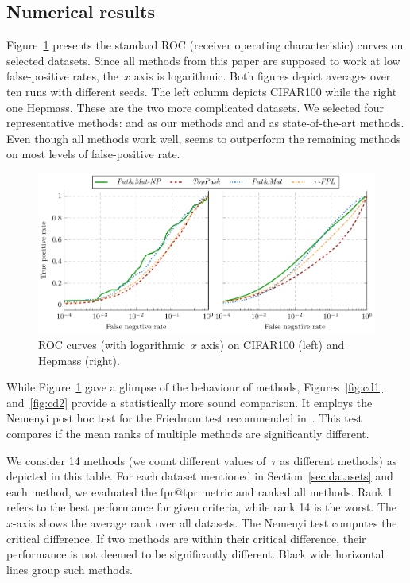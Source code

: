 \subsection{Numerical results}

Figure~\ref{fig:ptau} presents the standard ROC (receiver operating characteristic) curves on selected datasets. Since all methods from this paper are supposed to work at low false-positive rates, the~$x$ axis is logarithmic. Both figures depict averages over ten runs with different seeds. The left column depicts CIFAR100 while the right one Hepmass. These are the two more complicated datasets. We selected four representative methods: \PatMat and \PatMatNP as our methods and \TopPush and \tauFPL as state-of-the-art methods. Even though all methods work well, \PatMatNP seems to outperform the remaining methods on most levels of false-positive rate.

\begin{figure}[!ht]
  \centering
  \includegraphics[width = \linewidth]{images/primal_results.pdf}
  \caption{ROC curves (with logarithmic~$x$ axis) on CIFAR100 (left) and Hepmass (right).}
  \label{fig:ptau}
\end{figure}

While Figure~\ref{fig:ptau} gave a glimpse of the behaviour of methods, Figures~\ref{fig:cd1} and~\ref{fig:cd2} provide a statistically more sound comparison. It employs the Nemenyi post hoc test for the Friedman test recommended in~\cite{demvsar2006statistical}. This test compares if the mean ranks of multiple methods are significantly different.

We consider 14 methods (we count different values of~$\tau$ as different methods) as depicted in this table. For each dataset mentioned in Section~\ref{sec:datasets} and each method, we evaluated the fpr@tpr metric and ranked all methods. Rank 1 refers to the best performance for given criteria, while rank 14 is the worst. The~$x$-axis shows the average rank over all datasets. The Nemenyi test computes the critical difference. If two methods are within their critical difference, their performance is not deemed to be significantly different. Black wide horizontal lines group such methods.

